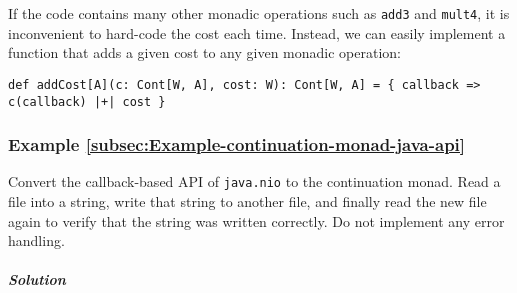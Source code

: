 If the code contains many other monadic operations such as \lstinline!add3!
and \lstinline!mult4!, it is inconvenient to hard-code the cost each
time. Instead, we can easily implement a function that adds a given
cost to any given monadic operation:
\begin{lstlisting}
def addCost[A](c: Cont[W, A], cost: W): Cont[W, A] = { callback => c(callback) |+| cost }
\end{lstlisting}


\subsubsection{Example \label{subsec:Example-continuation-monad-java-api}\ref{subsec:Example-continuation-monad-java-api}}

Convert the callback-based API of \lstinline!java.nio! to the continuation
monad. Read a file into a string, write that string to another file,
and finally read the new file again to verify that the string was
written correctly. Do not implement any error handling.

\subparagraph{Solution}

